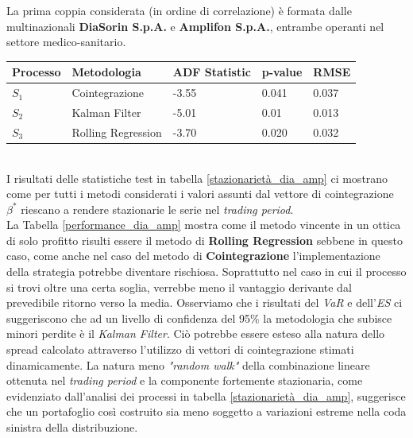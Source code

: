 \documentclass[]{article}
\begin{document}
La prima coppia considerata (in ordine di correlazione) è formata dalle multinazionali \textbf{DiaSorin S.p.A.} e  \textbf{Amplifon S.p.A.}, entrambe operanti nel settore medico-sanitario.

\begin{center}
	\label{stazionarietà_dia_amp}
	\begin{tabular}{ p{2cm}p{3cm}p{1cm}p{2cm}p{1cm}}
		\hline
		Processo & Metodologia & ADF Statistic & p-value & RMSE \\
		\hline
		$S_1$ & Cointegrazione & -3.55 & 0.041 & 0.037 \\
		$S_2$ & Kalman Filter & -5.01 & 0.01  & 0.013\\
		$S_3$ & Rolling Regression & -3.70 & 0.020 & 0.032  \\
		\hline
	\end{tabular}
\end{center}
\
\\
I risultati delle statistiche test  in tabella \ref{stazionarietà_dia_amp} ci mostrano come per tutti i metodi considerati i valori assunti dal vettore di cointegrazione $\beta^*$ riescano a rendere stazionarie le serie nel \textit{trading period}.
\\
La Tabella \ref{performance_dia_amp} mostra come il metodo vincente in un ottica di solo profitto risulti essere il metodo di \textbf{Rolling Regression} sebbene in questo caso, come anche nel caso del metodo di \textbf{Cointegrazione} l'implementazione della strategia potrebbe diventare rischiosa. Soprattutto nel caso in cui il processo si trovi oltre una certa soglia, verrebbe meno il vantaggio derivante dal prevedibile ritorno verso la media.
Osserviamo che  i risultati del \textit{VaR} e dell'\textit{ES} ci suggeriscono che  ad un livello di confidenza del 95\% la metodologia che subisce minori perdite è il \textit{Kalman Filter}.
Ciò potrebbe essere esteso alla natura dello spread calcolato attraverso l'utilizzo di vettori di cointegrazione stimati dinamicamente.
La natura meno \textit{"random walk"} della combinazione lineare ottenuta nel \textit{trading period} e la componente fortemente stazionaria, come evidenziato dall'analisi dei processi in tabella \ref{stazionarietà_dia_amp}, suggerisce che un portafoglio così costruito sia meno soggetto a variazioni estreme nella coda sinistra della distribuzione.
\end{document}
